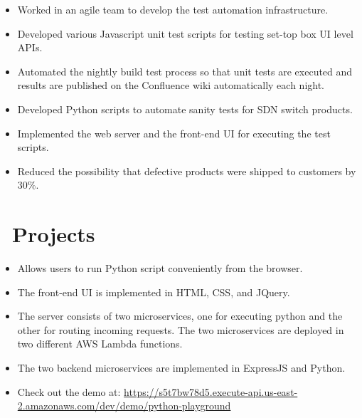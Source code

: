 \documentclass{resume}
\begin{document}
\begin{itemize}
	\item Worked in an agile team to develop the test automation infrastructure.
	\item Developed various Javascript unit test scripts for testing set-top box UI level APIs.
	\item Automated the nightly build test process so that unit tests are executed and results are published on the Confluence wiki automatically each night.
\end{itemize}

\begin{itemize}
	\item Developed Python scripts to automate sanity tests for SDN switch products.
	\item Implemented the web server and the front-end UI for executing the test scripts. 
	\item Reduced the possibility that defective products were shipped to customers by 30\%.
\end{itemize}

\section{\faUsers\ Projects}
\begin{itemize}
	\item Allows users to run Python script conveniently from the browser. 
	\item The front-end UI is implemented in HTML, CSS, and JQuery.
	\item The server consists of two microservices, one for executing python and the other for routing incoming requests. The two microservices are deployed in two different AWS Lambda functions.
	\item The two backend microservices are implemented in ExpressJS and Python.
	\item Check out the demo at: \url{https://s5t7bw78d5.execute-api.us-east-2.amazonaws.com/dev/demo/python-playground}  
\end{itemize}
\end{document}
